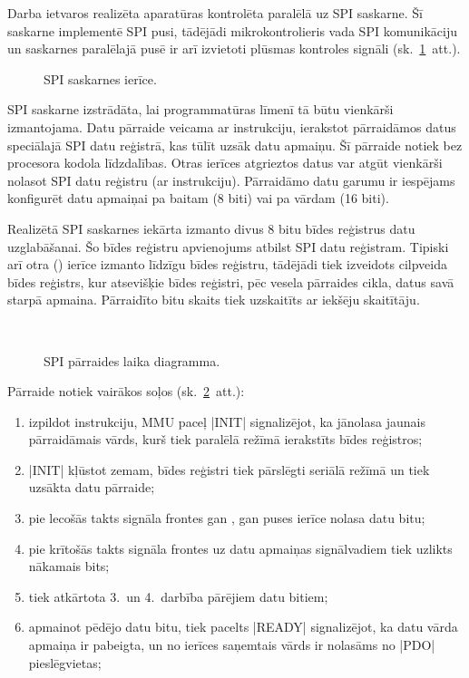 		Darba ietvaros realizēta aparatūras kontrolēta paralēlā uz SPI saskarne.
		Šī saskarne implementē SPI  pusi, tādējādi mikrokontrolieris
		vada SPI komunikāciju un saskarnes paralēlajā pusē ir arī izvietoti
		plūsmas kontroles signāli (sk.~\ref{fig:spi}~att.).
		
		\begin{figure}[thp]
			\centering
			\def\svgscale{1.25}
			{\ttfamily\scriptsize}
			\caption{SPI saskarnes ierīce.}
			\label{fig:spi}
		\end{figure}
		
		SPI saskarne izstrādāta, lai programmatūras līmenī tā būtu vienkārši
		izmantojama. Datu pārraide veicama ar  instrukciju, ierakstot
		pārraidāmos datus speciālajā SPI datu reģistrā, kas tūlīt uzsāk datu
		apmaiņu. Šī pārraide notiek bez procesora kodola līdzdalības.
		Otras ierīces atgrieztos datus var atgūt vienkārši nolasot
		SPI datu reģistru (ar  instrukciju). Pārraidāmo datu garumu
		ir iespējams konfigurēt datu apmaiņai pa baitam (8 biti) vai
		pa vārdam (16 biti).
		
		Realizētā SPI saskarnes iekārta izmanto divus 8 bitu bīdes reģistrus
		datu uzglabāšanai. Šo bīdes reģistru apvienojums atbilst SPI datu reģistram.
		Tipiski arī otra ()
		ierīce izmanto līdzīgu bīdes reģistru, tādējādi tiek izveidots cilpveida
		bīdes reģistrs, kur atsevišķie bīdes reģistri, pēc vesela pārraides cikla,
		datus savā starpā apmaina. Pārraidīto bitu skaits tiek uzskaitīts
		ar iekšēju skaitītāju. 
		\begin{figure}[th]
			\centering
			\def\svgwidth{\textwidth}
			{\ttfamily\footnotesize}\\
			\caption{SPI pārraides laika diagramma.}
			\label{fig:spi-tx}
		\end{figure}
		Pārraide notiek vairākos soļos
		(sk.~\ref{fig:spi-tx}~att.):
		\begin{enumerate}
			\item izpildot  instrukciju, MMU paceļ |INIT|
				signalizējot, ka jānolasa jaunais pārraidāmais vārds, kurš
				tiek paralēlā režīmā ierakstīts bīdes reģistros;
			\item |INIT| kļūstot zemam, bīdes reģistri tiek pārslēgti
				seriālā režīmā un tiek uzsākta datu pārraide;
			\item pie lecošās takts signāla frontes gan ,
				gan  puses ierīce nolasa datu bitu;
			\item pie krītošās takts signāla frontes uz datu apmaiņas
				signālvadiem tiek uzlikts nākamais bits;
			\item tiek atkārtota 3.~un 4.~darbība pārējiem datu bitiem;
			\item apmainot pēdējo datu bitu, tiek pacelts |READY|
				signalizējot, ka datu vārda apmaiņa ir pabeigta, un no
				 ierīces
				saņemtais vārds ir nolasāms no |PDO| pieslēgvietas;
		\end{enumerate}
		
